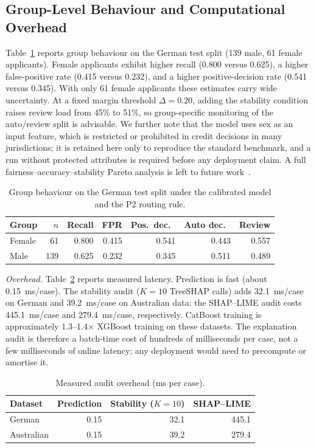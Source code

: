 \documentclass[journal]{IEEEtran}
\begin{document}
\subsection{Group-Level Behaviour and Computational Overhead}

Table~\ref{tab:groups} reports group behaviour on the German test split (139
male, 61 female applicants). Female applicants exhibit higher recall (0.800
versus 0.625), a higher false-positive rate (0.415 versus 0.232), and a higher
positive-decision rate (0.541 versus 0.345). With only 61 female applicants
these estimates carry wide uncertainty. At a fixed margin threshold
$\Delta=0.20$, adding the stability condition raises review load from 45\% to
51\%, so group-specific monitoring of the auto/review split is advisable. We
further note that the model uses sex as an input feature, which is restricted
or prohibited in credit decisions in many jurisdictions; it is retained here
only to reproduce the standard benchmark, and a run without protected
attributes is required before any deployment claim. A full
fairness--accuracy--stability Pareto analysis is left to future
work~\cite{das2023algorithmic}.

\begin{table}[t]
\caption{Group behaviour on the German test split under the calibrated model
and the P2 routing rule.}
\label{tab:groups}
\centering
\footnotesize
\begin{tabular}{@{}lrrrrrr@{}}
\toprule
Group & $n$ & Recall & FPR & Pos.\ dec.\ & Auto dec.\ & Review \\
\midrule
Female & 61  & 0.800 & 0.415 & 0.541 & 0.443 & 0.557 \\
Male   & 139 & 0.625 & 0.232 & 0.345 & 0.511 & 0.489 \\
\bottomrule
\end{tabular}
\end{table}

\emph{Overhead.} Table~\ref{tab:overhead} reports measured latency. Prediction
is fast (about 0.15~ms/case). The stability audit ($K=10$ TreeSHAP calls) adds
32.1~ms/case on German and 39.2~ms/case on Australian data; the SHAP--LIME
audit costs 445.1~ms/case and 279.4~ms/case, respectively. CatBoost training is
approximately 1.3--1.4$\times$ XGBoost training on these datasets. The
explanation audit is therefore a batch-time cost of hundreds of milliseconds
per case, not a few milliseconds of online latency; any deployment would need
to precompute or amortise it.

\begin{table}[t]
\caption{Measured audit overhead (ms per case).}
\label{tab:overhead}
\centering
\footnotesize
\begin{tabular}{@{}lrrr@{}}
\toprule
Dataset & Prediction & Stability ($K=10$) & SHAP--LIME \\
\midrule
German     & 0.15 & 32.1 & 445.1 \\
Australian & 0.15 & 39.2 & 279.4 \\
\bottomrule
\end{tabular}
\end{table}
\end{document}
